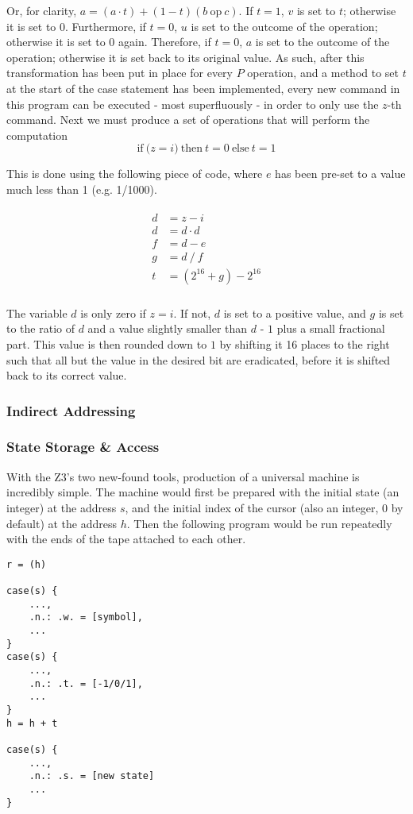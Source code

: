 \documentclass[Master.tex]{subfiles}
\begin{document}
Or, for clarity, $a = (a \cdot t) + (1 - t)(b\ \mathrm{op}\ c)$. If $t = 1$, $v$ is set to $t$; otherwise it is set to $0$. Furthermore, if $t = 0$, $u$ is set to the outcome of the operation; otherwise it is set to $0$ again. Therefore, if $t = 0$, $a$ is set to the outcome of the operation; otherwise it is set back to its original value. As such, after this transformation has been put in place for every $P$ operation, and a method to set $t$ at the start of the case statement has been implemented, every new command in this program can be executed - most superfluously - in order to only use the $z$-th command. Next we must produce a set of operations that will perform the computation
\begin{equation*}
\mathrm{if\ (}z = i\mathrm{)\ then\ } t = 0 \mathrm{\ else\ } t = 1
\end{equation*}

This is done using the following piece of code, where $e$ has been pre-set to a value much less than 1 (e.g. 1/1000).

\begin{gather*}
\begin{aligned}
d &= z - i \\
d &= d \cdot d \\
f &= d - e \\
g &= d\ /\ f \\[1ex]
t &= (2^{16} + g) - 2^{16} \\
\end{aligned}
\end{gather*}

The variable $d$ is only zero if $z = i$. If not, $d$ is set to a positive value, and $g$ is set to the ratio of $d$ and a value slightly smaller than $d$ - $1$ plus a small fractional part. This value is then rounded down to $1$ by shifting it 16 places to the right such that all but the value in the desired bit are eradicated, before it is shifted back to its correct value.

\subsubsection{Indirect Addressing}

\subsubsection{State Storage \& Access}

With the Z3's two new-found tools, production of a universal machine is incredibly simple. The machine would first be prepared with the initial state (an integer) at the address $s$, and the initial index of the cursor (also an integer, $0$ by default) at the address $h$. Then the following program would be run repeatedly with the ends of the tape attached to each other.
\begin{lstlisting}
r = (h)

case(s) {
	...,
	.n.: .w. = [symbol],
	...
}
case(s) {
	...,
	.n.: .t. = [-1/0/1],
	...
}
h = h + t

case(s) {
	...,
	.n.: .s. = [new state]
	...
}
\end{lstlisting}
\end{document}
